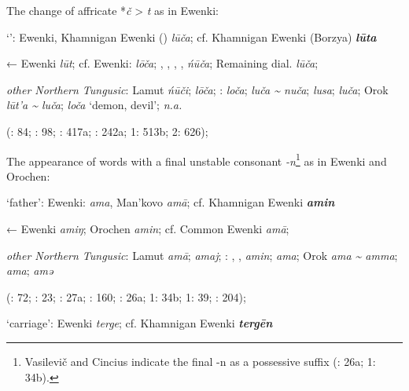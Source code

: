 \documentclass[output=paper,colorlinks,citecolor=brown]{langscibook}
\begin{document}
\ea
The change of affricate *\textit{č} > \textit{t} as in  Ewenki:

    \ea ‘’:  Ewenki, Khamnigan Ewenki () \textit{lūča}; cf. Khamnigan Ewenki (Borzya) \textbf{\textit{lūta}}

    ←  Ewenki \textit{lūt}; cf.  Ewenki:  \textit{lōča}; , , , ,  \textit{ńūča}; Remaining dial. \textit{lūča};

    \textit{other Northern Tungusic}: Lamut \textit{ńūči};  \textit{lōča}; \textit{}:  \textit{loča};  \textit{luča {\textasciitilde} nuča};  \textit{lusa};  \textit{luča}; Orok \textit{lūt’a {\textasciitilde} luča};  \textit{loča} ‘demon, devil’;  \textit{n.a.} 
    
    (\citealt{Castrén1856}: 84; \citealt{Janhunen1991}: 98; \citealt{Dorji1998}: 417a; \citealt{Vasilevic1958}: 242a; \citealt{Cincius1975B} 1: 513b; \citealt{Hauer1952} 2: 626);
\z\z


\ea
The appearance of words with a final unstable consonant \textit{-n}\footnote{Vasilevič and Cincius indicate the final -n as a possessive suffix (\citealt{Vasilevic1958}: 26a; \citealt{Cincius1975B} 1: 34b).} as in  Ewenki and Orochen:

\ea ‘father’:  Ewenki:  \textit{ama}, Man’kovo \textit{amā}; cf. Khamnigan Ewenki \textbf{\textit{amin}}

    ←  Ewenki \textit{amiŋ}; Orochen \textit{amin}; cf.  Common Ewenki \textit{amā};

    \textit{other Northern Tungusic}: Lamut \textit{amā};  \textit{amaj}; \textit{}: , ,  \textit{amin};  \textit{ama}; Orok \textit{ama {\textasciitilde} amma};  \textit{ama};  \textit{amǝ}
    
    (\citealt{Castrén1856}: 72; \citealt{Janhunen1991}: 23; \citealt{Dorji1998}: 27a; \citealt{Chaoke2014a}: 160; \citealt{Vasilevic1958}: 26a; \citealt{Cincius1975B} 1: 34b; \citealt{Hauer1952} 1: 39; \citealt{Zikmundová2013a}: 204);

    \ex ‘carriage’:  Ewenki \textit{terge}; cf. Khamnigan Ewenki \textbf{\textit{tergēn}}
\end{document}
